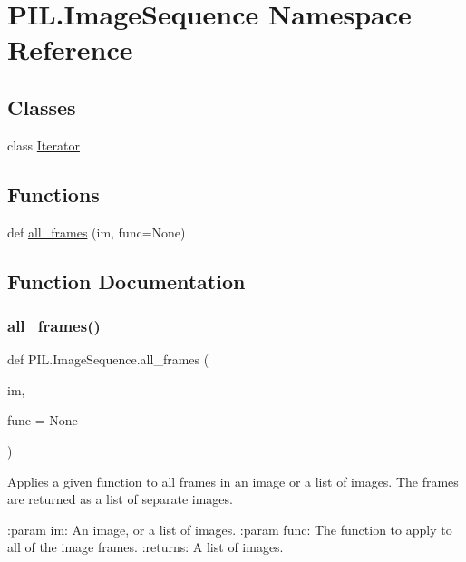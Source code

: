 \hypertarget{namespacePIL_1_1ImageSequence}{}\section{P\+I\+L.\+Image\+Sequence Namespace Reference}
\label{namespacePIL_1_1ImageSequence}
\subsection*{Classes}
\begin{DoxyCompactItemize}
\item 
class \hyperlink{classPIL_1_1ImageSequence_1_1Iterator}{Iterator}
\end{DoxyCompactItemize}
\subsection*{Functions}
\begin{DoxyCompactItemize}
\item 
def \hyperlink{namespacePIL_1_1ImageSequence_a2f62741d0417fbbcaeabdb61423ed63d}{all\+\_\+frames} (im, func=None)
\end{DoxyCompactItemize}


\subsection{Function Documentation}
\mbox{\label{namespacePIL_1_1ImageSequence_a2f62741d0417fbbcaeabdb61423ed63d}} 
\subsubsection{\texorpdfstring{all\+\_\+frames()}{all\_frames()}}
{\footnotesize\ttfamily def P\+I\+L.\+Image\+Sequence.\+all\+\_\+frames (\begin{DoxyParamCaption}\item[{}]{im,  }\item[{}]{func = {\ttfamily None} }\end{DoxyParamCaption})}

\begin{DoxyVerb}Applies a given function to all frames in an image or a list of images.
The frames are returned as a list of separate images.

:param im: An image, or a list of images.
:param func: The function to apply to all of the image frames.
:returns: A list of images.
\end{DoxyVerb}
 